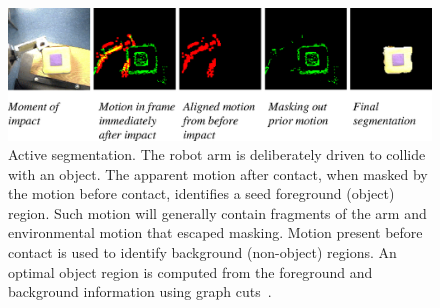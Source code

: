 \begin{figure}[bt]
\includegraphics[width=\columnwidth]{fig-separate-simple}
\caption
{
\label{fig:separate-simple}
%
Active segmentation.  The robot arm is deliberately driven
to collide with an object.
 The
apparent motion after contact, when masked by the motion before
contact, identifies a seed foreground (object) region.  Such motion
will generally contain fragments of the arm and environmental motion
that escaped masking.  Motion present before contact is used to
identify background (non-object) regions.  
An optimal object region is computed from the foreground and
background information using graph cuts~\citep{boykov01experimental,
fitzpatrick03first}.
%
%
}
\end{figure}

